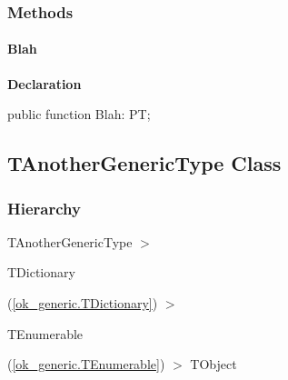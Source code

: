 \documentclass{report}
\newif\ifpdf
\begin{document}
\subsubsection*{\large{\textbf{Methods}}\normalsize\hspace{1ex}\hfill}
\paragraph*{Blah}\hspace*{\fill}

\label{ok_generic.TMyNewGeneric-Blah}
\begin{list}{}{
\setlength{\itemindent}{0cm}
\setlength{\listparindent}{0cm}
\setlength{\leftmargin}{\evensidemargin}
\addtolength{\leftmargin}{\tmplength}
\settowidth{\labelsep}{X}
\addtolength{\leftmargin}{\labelsep}
\setlength{\labelwidth}{\tmplength}
}
\item[\textbf{Declaration}\hfill]
\ifpdf
\begin{flushleft}
\fi
\begin{ttfamily}
public function Blah: PT;\end{ttfamily}

\ifpdf
\end{flushleft}
\fi

\end{list}
\ifpdf
\subsection*{\large{\textbf{TAnotherGenericType Class}}\normalsize\hspace{1ex}\hrulefill}
\else
\subsection*{TAnotherGenericType Class}
\fi
\label{ok_generic.TAnotherGenericType}
\subsubsection*{\large{\textbf{Hierarchy}}\normalsize\hspace{1ex}\hfill}
TAnotherGenericType {$>$} \begin{ttfamily}TDictionary\end{ttfamily}(\ref{ok_generic.TDictionary}) {$>$} \begin{ttfamily}TEnumerable\end{ttfamily}(\ref{ok_generic.TEnumerable}) {$>$} 
TObject
\end{document}

